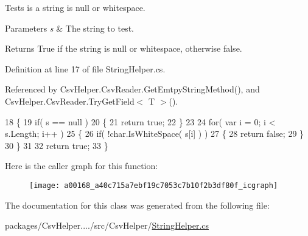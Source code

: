 Tests is a string is null or whitespace. 


\begin{DoxyParams}{Parameters}
{\em s} & The string to test.\\
\hline
\end{DoxyParams}
\begin{DoxyReturn}{Returns}
True if the string is null or whitespace, otherwise false.
\end{DoxyReturn}


Definition at line 17 of file String\-Helper.\-cs.



Referenced by Csv\-Helper.\-Csv\-Reader.\-Get\-Emtpy\-String\-Method(), and Csv\-Helper.\-Csv\-Reader.\-Try\-Get\-Field$<$ T $>$().


\begin{DoxyCode}
18         \{
19             \textcolor{keywordflow}{if}( s == null )
20             \{
21                 \textcolor{keywordflow}{return} \textcolor{keyword}{true};
22             \}
23 
24             \textcolor{keywordflow}{for}( var i = 0; i < s.Length; i++ )
25             \{
26                 \textcolor{keywordflow}{if}( !\textcolor{keywordtype}{char}.IsWhiteSpace( s[i] ) )
27                 \{
28                     \textcolor{keywordflow}{return} \textcolor{keyword}{false};
29                 \}
30             \}
31 
32             \textcolor{keywordflow}{return} \textcolor{keyword}{true};
33         \}
\end{DoxyCode}


Here is the caller graph for this function\-:
\nopagebreak
\begin{figure}[H]
\begin{center}
\leavevmode
\texttt{[image: a00168\_a40c715a7ebf19c7053c7b10f2b3df80f\_icgraph]}
\end{center}
\end{figure}




The documentation for this class was generated from the following file\-:\begin{DoxyCompactItemize}
\item 
packages/\-Csv\-Helper..../src/\-Csv\-Helper/\hyperlink{a00259}{String\-Helper.\-cs}\end{DoxyCompactItemize}
